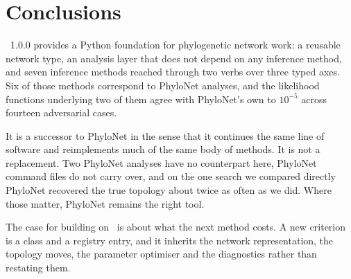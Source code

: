 \section{Conclusions}
\label{sec:conclusion}

\phynetpy\ 1.0.0 provides a Python foundation for phylogenetic network work:
a reusable network type, an analysis layer that does not depend on any inference
method, and seven inference methods reached through two verbs over three typed
axes. Six of those methods correspond to PhyloNet analyses, and the
likelihood functions underlying two of them agree with PhyloNet's own to
$10^{-5}$ across fourteen adversarial cases.

It is a successor to PhyloNet in the sense that it continues the same line of
software and reimplements much of the same body of methods. It is not a
replacement. Two PhyloNet analyses have no counterpart here, PhyloNet command
files do not carry over, and on the one search we compared directly PhyloNet
recovered the true topology about twice as often as we did. Where those matter,
PhyloNet remains the right tool.

The case for building on \phynetpy\ is about what the next method costs. A new
criterion is a class and a registry entry, and it inherits the network
representation, the topology moves, the parameter optimiser and the diagnostics
rather than restating them.
